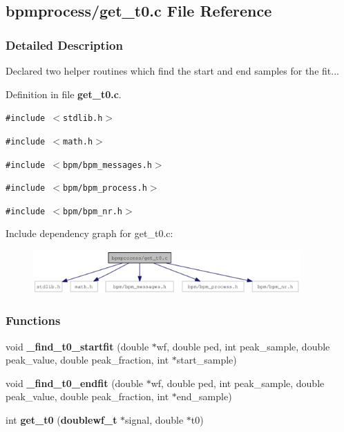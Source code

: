 \subsection{bpmprocess/get\_\-t0.c File Reference}
\label{get__t0_8c}


\subsubsection{Detailed Description}
Declared two helper routines which find the start and end samples for the fit... 

Definition in file {\bf get\_\-t0.c}.

{\tt \#include $<$stdlib.h$>$}\par
{\tt \#include $<$math.h$>$}\par
{\tt \#include $<$bpm/bpm\_\-messages.h$>$}\par
{\tt \#include $<$bpm/bpm\_\-process.h$>$}\par
{\tt \#include $<$bpm/bpm\_\-nr.h$>$}\par


Include dependency graph for get\_\-t0.c:\nopagebreak
\begin{figure}[H]
\begin{center}
\leavevmode
\includegraphics[width=290pt]{get__t0_8c__incl}
\end{center}
\end{figure}
\subsubsection*{Functions}
\begin{CompactItemize}
\item 
void \textbf{\_\-find\_\-t0\_\-startfit} (double $\ast$wf, double ped, int peak\_\-sample, double peak\_\-value, double peak\_\-fraction, int $\ast$start\_\-sample)\label{get__t0_8c_4441082bcc7dd3cf1c46f1dfecc64690}

\item 
void \textbf{\_\-find\_\-t0\_\-endfit} (double $\ast$wf, double ped, int peak\_\-sample, double peak\_\-value, double peak\_\-fraction, int $\ast$end\_\-sample)\label{get__t0_8c_139780fe168b903f9eba5539fb51e5b4}

\item 
int {\bf get\_\-t0} ({\bf doublewf\_\-t} $\ast$signal, double $\ast$t0)
\end{CompactItemize}
